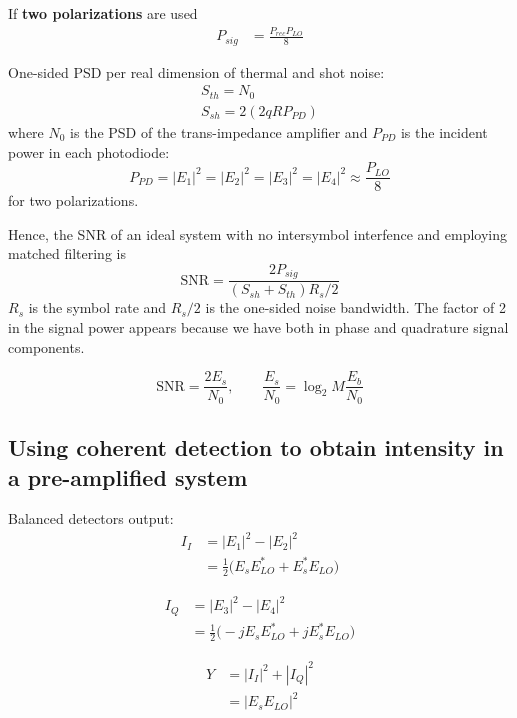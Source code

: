 \documentclass[a4paper]{article}
\begin{document}
If \textbf{two polarizations} are used
\begin{align} 
P_{sig} &= \frac{P_{rec}P_{LO}}{8}
\end{align}

One-sided PSD per real dimension of thermal and shot noise:
\begin{align}
S_{th} = N_0 \\
S_{sh} = 2(2qRP_{PD})
\end{align}
where $N_0$ is the PSD of the trans-impedance amplifier and $P_{PD}$ is the incident power in each photodiode:
\begin{equation}
P_{PD} = |E_1|^2 = |E_2|^2 = |E_3|^2 = |E_4|^2 \approx \frac{P_{LO}}{8}
\end{equation}
for two polarizations.

Hence, the SNR of an ideal system with no intersymbol interfence and employing matched filtering is 
\begin{equation}
\mathrm{SNR} = \frac{2P_{sig}}{(S_{sh} + S_{th})R_s/2}
\end{equation}
$R_s$ is the symbol rate and $R_s/2$ is the one-sided noise bandwidth. The factor of 2 in the signal power appears because we have both in phase and quadrature signal components.

\begin{equation}
\mathrm{SNR} = \frac{2E_s}{N_0}, \qquad \frac{E_s}{N_0} = \log_2M\frac{E_b}{N_0}
\end{equation}

\subsection{Using coherent detection to obtain intensity in a pre-amplified system}

Balanced detectors output:
\begin{align} \nonumber
I_I &= |E_1|^2 - |E_2|^2 \\ \nonumber
&= \frac{1}{2}\Big(E_sE_{LO}^* + E_s^*E_{LO} \Big)
\end{align}

\begin{align} \nonumber
I_Q &= |E_3|^2 - |E_4|^2 \\ \nonumber
&= \frac{1}{2}\Big(-jE_sE_{LO}^* + jE_s^*E_{LO}\Big)
\end{align}

\begin{align} \nonumber
Y &= |I_I|^2 + |I_Q|^2 \\ \nonumber
&= |E_sE_{LO}|^2
\end{align}
\end{document}
